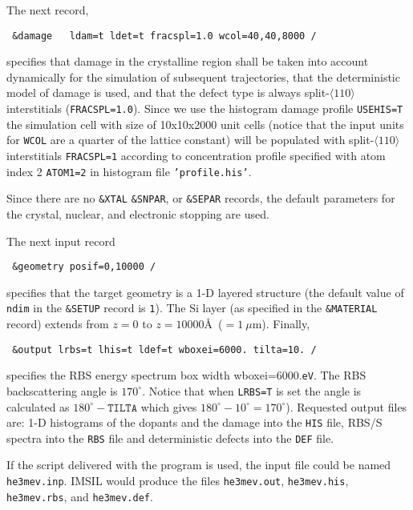 The next record,
%
\begin{verbatim}
 &damage   ldam=t ldet=t fracspl=1.0 wcol=40,40,8000 /
\end{verbatim}
%
specifies that damage in the crystalline region shall be taken into account
dynamically for the simulation of subsequent trajectories, that the
deterministic model of damage is used, and that the defect type is always
split-$\langle 110 \rangle$ interstitials (\texttt{FRACSPL=1.0}). Since we use
the histogram damage profile \texttt{USEHIS=T} the simulation cell with size
of 10x10x2000 unit cells (notice that the input units for \texttt{WCOL} are a
quarter of the lattice constant) will be populated with
split-$\langle110\rangle$ interstitials \texttt{FRACSPL=1} according to
concentration profile specified with atom index 2 \texttt{ATOM1=2} in
histogram file \texttt{'profile.his'}.

Since there are no \texttt{\&XTAL} \texttt{\&SNPAR}, or \texttt{\&SEPAR}
records, the default parameters for the crystal, nuclear, and electronic
stopping are used.

The next input record
%
\begin{verbatim}
 &geometry posif=0,10000 /
\end{verbatim}
%
specifies that the target geometry is a 1-D layered structure (the default value
of \texttt{ndim} in the \texttt{\&SETUP} record is \texttt{1}). The Si layer (as
specified in the \texttt{\&MATERIAL} record) extends from $z=0$ to
$z=10000$\AA\ ($=1~\mu$m). Finally,
%
\begin{verbatim}
 &output lrbs=t lhis=t ldef=t wboxei=6000. tilta=10. /
\end{verbatim}
%
specifies the RBS energy spectrum box width wboxei=6000.\texttt{eV}. The RBS
backscattering angle is $170^\circ$. Notice that when \texttt{LRBS=T} is set the
angle is calculated as $\texttt{$180^\circ$} - \texttt{TILTA}$ which gives
$180^\circ - 10^\circ = 170^\circ$). Requested output files are: 1-D
histograms of the dopants and the damage into the \texttt{HIS} file,
RBS/S spectra into the \texttt{RBS} file and deterministic defects into the
\texttt{DEF} file.

If the script delivered with the program is used, the input file could be
named \texttt{he3mev.inp}. IMSIL would produce the files \texttt{he3mev.out},
\texttt{he3mev.his}, \texttt{he3mev.rbs}, and \texttt{he3mev.def}.

